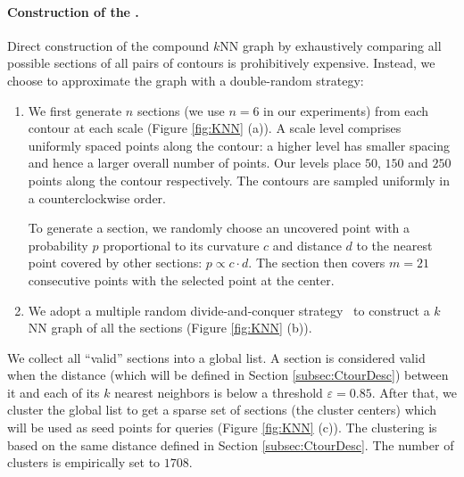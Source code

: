 \paragraph*{Construction of the {\RCKNNG}.} Direct construction of the compound $k$NN graph by exhaustively comparing all possible sections of all pairs of contours is prohibitively expensive. Instead, we choose to approximate the graph with a double-random strategy:
%
\begin{enumerate}
  \item We first generate $n$ sections (we use $n=6$ in our experiments) from each contour at each scale (Figure \ref{fig:KNN} (a)). A scale level comprises uniformly spaced points along the contour: a higher level has smaller spacing and hence a larger overall number of points. Our levels place $50$, $150$ and $250$ points along the contour respectively. The contours are sampled uniformly in a counterclockwise order.

To generate a section, we randomly choose an uncovered point with a probability $p$ proportional to its curvature $c$ and distance $d$ to the nearest point covered by other sections: $p \propto c \cdot d$. The section then covers $m = 21$ consecutive points with the selected point at the center.

  \item We adopt a multiple random divide-and-conquer strategy~\cite{scalableknnjingwangcvpr2012} to construct a $k$NN graph of all the sections (Figure \ref{fig:KNN} (b)).
\end{enumerate}
%
We collect all ``valid'' sections into a global list. A section is considered valid when the distance (which will be defined in Section \ref{subsec:CtourDesc}) between it and each of its $k$ nearest neighbors is below a threshold $\varepsilon=0.85$. After that, we cluster the global list to get a sparse set of sections (the cluster centers) which will be used as seed points for queries (Figure \ref{fig:KNN} (c)). The clustering is based on the same distance defined in Section \ref{subsec:CtourDesc}. The number of clusters is empirically set to $1708$.
%

